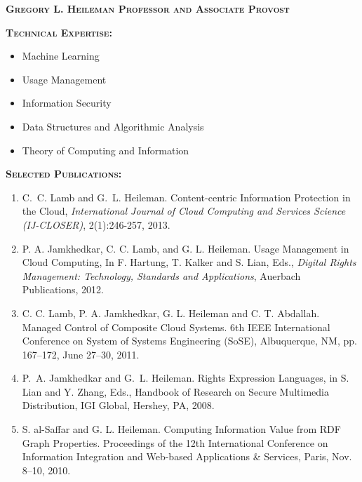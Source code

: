 \documentclass{sbir}
\begin{document}
{\textbf{\textsc{Gregory L. Heileman \hfill Professor and Associate Provost}}

\vspace{-18pt}
{\textcolor{black}{\makebox[6.5in]{\hrulefill}} 
\textbf{\textsc{Technical Expertise:}}
\vspace{-8pt}
\begin{multicols}{2}
 \begin{itemize}
  \item Machine Learning
  \item Usage Management
  \item Information Security
  \item Data Structures and Algorithmic Analysis
  \item Theory of Computing and Information        
 \end{itemize}
\end{multicols}

\vspace{-16pt}
\textbf{\textsc{Selected Publications:}}
\vspace{-8pt}
\begin{enumerate}
\item C.~C. Lamb and G.~L. Heileman. Content-centric Information Protection in the Cloud, {\sl International Journal of Cloud Computing and Services Science  (IJ-CLOSER)}, 2(1):246-257, 2013.

\item P. A. Jamkhedkar, C. C. Lamb, and G. L. Heileman. Usage Management in Cloud Computing, In F. Hartung, T. Kalker and S. Lian, Eds., {\sl Digital Rights Management: Technology, Standards and Applications}, Auerbach Publications, 2012. 

\item C. C. Lamb, P. A. Jamkhedkar, G. L. Heileman and C. T. Abdallah. Managed Control of Composite Cloud Systems. 6th IEEE International Conference on System of Systems Engineering (SoSE), Albuquerque, NM, pp. 167--172, June 27--30, 2011.

\item P.~A. Jamkhedkar and G.~L. Heileman. Rights Expression Languages, in S. Lian and Y. Zhang, Eds., {Handbook of Research on Secure Multimedia Distribution}, IGI Global, Hershey, PA, 2008.
 
\item S. al-Saffar and G. L. Heileman. Computing Information Value from RDF Graph Properties. Proceedings of the 12th International Conference on Information Integration and Web-based Applications \& Services, Paris, Nov. 8--10, 2010.


\end{enumerate}}}
\end{document}
